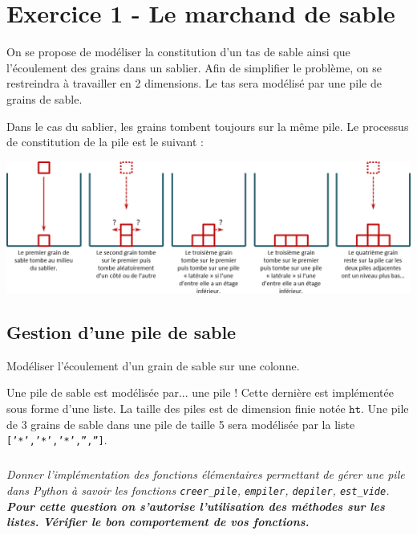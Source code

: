 
\section*{Exercice 1 - Le marchand de sable}
On se propose de modéliser la constitution d'un tas de sable ainsi que l'écoulement des grains dans un sablier. Afin de simplifier le problème, on se restreindra à travailler en 2 dimensions. Le tas sera modélisé par une pile de grains de sable. 


Dans le cas du sablier, les grains tombent toujours sur la même pile. Le processus de constitution de la pile est le suivant : 
\begin{center}
\includegraphics[width=\linewidth]{images/sablier_02}
\end{center}
\subsection*{Gestion d'une pile de sable}

\begin{obj}
Modéliser l'écoulement d'un grain de sable sur une colonne. 
\end{obj}


Une pile de sable est modélisée par... une pile ! Cette dernière est implémentée sous forme d'une liste. 
La taille des piles est de dimension finie notée $\texttt{ht}$. 
Une pile de 3 grains de sable dans une pile de taille 5 sera modélisée par la liste \texttt{['*','*','*','','']}.


\subparagraph{}
\textit{Donner l'implémentation des fonctions élémentaires permettant de gérer une pile dans Python à savoir les fonctions \texttt{creer\_pile}, \texttt{empiler}, \texttt{depiler}, \texttt{est\_vide}. \textbf{Pour cette question on s'autorise l'utilisation des méthodes sur les listes.} \textbf{Vérifier le bon comportement de vos fonctions.}}


